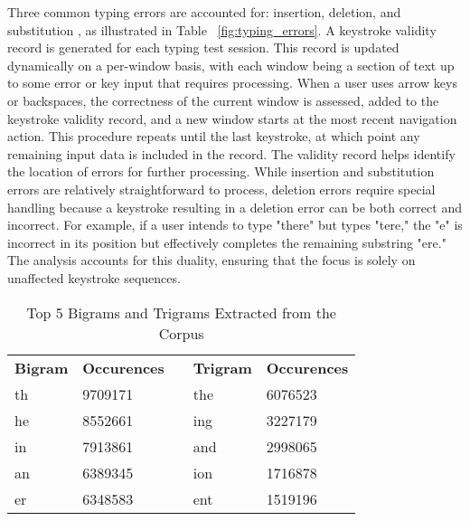 \noindent Three common typing errors are accounted for: insertion, deletion, and substitution \citep{navarro2001guided}, as illustrated in Table ~\ref{fig:typing_errors}. A keystroke validity record is generated for each typing test session. This record is updated dynamically on a per-window basis, with each window being a section of text up to some error or key input that requires processing. When a user uses arrow keys or backspaces, the correctness of the current window is assessed, added to the keystroke validity record, and a new window starts at the most recent navigation action. This procedure repeats until the last keystroke, at which point any remaining input data is included in the record. The validity record helps identify the location of errors for further processing. While insertion and substitution errors are relatively straightforward to process, deletion errors require special handling because a keystroke resulting in a deletion error can be both correct and incorrect. For example, if a user intends to type "there" but types "tere," the "e" is incorrect in its position but effectively completes the remaining substring "ere." The analysis accounts for this duality, ensuring that the focus is solely on unaffected keystroke sequences.

\begin{table}[h]
\caption{Top 5 Bigrams and Trigrams Extracted from the Corpus}
\begin{center}
\begin{tabular}{lllll}
\textbf{Bigram} & \textbf{Occurences} &  & \textbf{Trigram} & \textbf{Occurences} \\
th              & 9709171             &  & the              & 6076523             \\
he              & 8552661             &  & ing              & 3227179             \\
in              & 7913861             &  & and              & 2998065             \\
an              & 6389345             &  & ion              & 1716878             \\
er              & 6348583             &  & ent              & 1519196            
\end{tabular}
\end{center}
\label{fig:ngrams}
\end{table}


